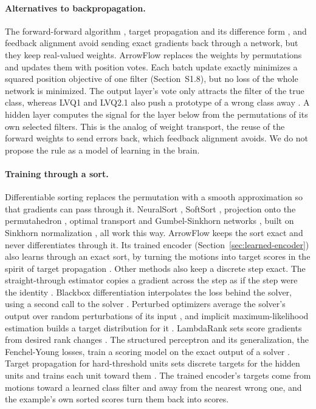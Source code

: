 \paragraph{Alternatives to backpropagation.}
The forward-forward algorithm \citep{hinton2022forward}, target propagation \citep{bengio2014auto} and its difference form \citep{lee2015difference}, and feedback alignment \citep{lillicrap2016random} avoid sending exact gradients back through a network, but they keep real-valued weights. ArrowFlow replaces the weights by permutations and updates them with position votes. Each batch update exactly minimizes a squared position objective of one filter (Section~S1.8), but no loss of the whole network is minimized. The output layer's vote only attracts the filter of the true class, whereas LVQ1 and LVQ2.1 also push a prototype of a wrong class away \citep{kohonen1990self}. A hidden layer computes the signal for the layer below from the permutations of its own selected filters. This is the analog of weight transport, the reuse of the forward weights to send errors back, which feedback alignment avoids. We do not propose the rule as a model of learning in the brain.

\paragraph{Training through a sort.}
Differentiable sorting replaces the permutation with a smooth approximation so that gradients can pass through it. NeuralSort \citep{grover2019neuralsort}, SoftSort \citep{prillo2020softsort}, projection onto the permutahedron \citep{blondel2020fast}, optimal transport \citep{cuturi2019ot} and Gumbel-Sinkhorn networks \citep{mena2018gumbelsinkhorn}, built on Sinkhorn normalization \citep{sinkhorn1967diagonal}, all work this way. ArrowFlow keeps the sort exact and never differentiates through it. Its trained encoder (Section~\ref{sec:learned-encoder}) also learns through an exact sort, by turning the motions into target scores in the spirit of target propagation \citep{bengio2014auto,lee2015difference}. Other methods also keep a discrete step exact. The straight-through estimator copies a gradient across the step as if the step were the identity \citep{bengio2013estimating,sahoo2023identity}. Blackbox differentiation interpolates the loss behind the solver, using a second call to the solver \citep{vlastelica2020differentiation,rolinek2020optimizing}. Perturbed optimizers average the solver's output over random perturbations of its input \citep{berthet2020perturbed}, and implicit maximum-likelihood estimation builds a target distribution for it \citep{niepert2021imle}. LambdaRank sets score gradients from desired rank changes \citep{burges2006nonsmooth}. The structured perceptron and its generalization, the Fenchel-Young losses, train a scoring model on the exact output of a solver \citep{collins2002perceptron,blondel2020fenchel}. Target propagation for hard-threshold units sets discrete targets for the hidden units and trains each unit toward them \citep{bengio2014auto,friesen2018combinatorial}. The trained encoder's targets come from motions toward a learned class filter and away from the nearest wrong one, and the example's own sorted scores turn them back into scores.

